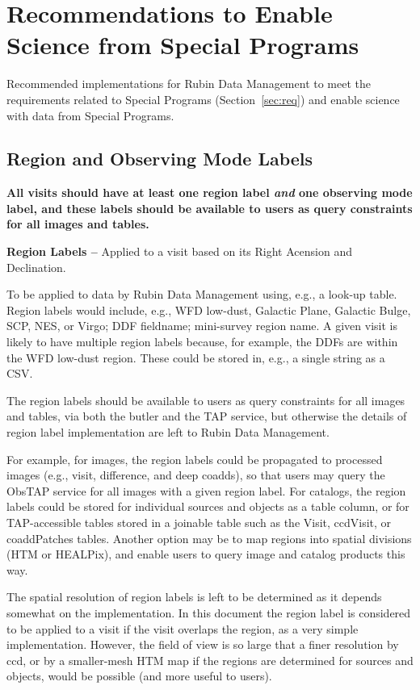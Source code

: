 \section{Recommendations to Enable Science from Special Programs}\label{sec:sci}

Recommended implementations for Rubin Data Management to meet the 
requirements related to Special Programs (Section~\ref{sec:req})
and enable science with data from Special Programs.

\subsection{Region and Observing Mode Labels}\label{ssec:sci_labels}

\textbf{All visits should have at least one region label \textit{and} one observing mode 
label, and these labels should be available to users as query constraints for
all images and tables.}

\textbf{Region Labels -- } 
Applied to a visit based on its Right Acension and Declination.

To be applied to data by Rubin Data Management using, e.g., a look-up table.
Region labels would include, e.g., WFD low-dust, Galactic Plane, Galactic 
Bulge, SCP, NES, or Virgo; DDF fieldname; mini-survey region name.
A given visit is likely to have multiple region labels because, for example,
the DDFs are within the WFD low-dust region.
These could be stored in, e.g., a single string as a CSV.

The region labels should be available to users as query constraints for
all images and tables, via both the butler and the TAP service, but otherwise
the details of region label implementation are left to Rubin Data Management.

For example, for images, the region labels could be propagated to processed images
(e.g., visit, difference, and deep coadds), so that users may query the ObsTAP 
service for all images with a given region label.
For catalogs, the region labels could be stored for individual sources and
objects as a table column, or for TAP-accessible tables stored in a joinable
table such as the Visit, ccdVisit, or coaddPatches tables.
Another option may be to map regions into spatial divisions (HTM or HEALPix),
and enable users to query image and catalog products this way.

The spatial resolution of region labels is left to be determined as it depends
somewhat on the implementation.
In this document the region label is considered to be applied to a visit
if the visit overlaps the region, as a very simple implementation.
However, the field of view is so large that a finer resolution by ccd,
or by a smaller-mesh HTM map if the regions are determined for sources and objects,
would be possible (and more useful to users).


